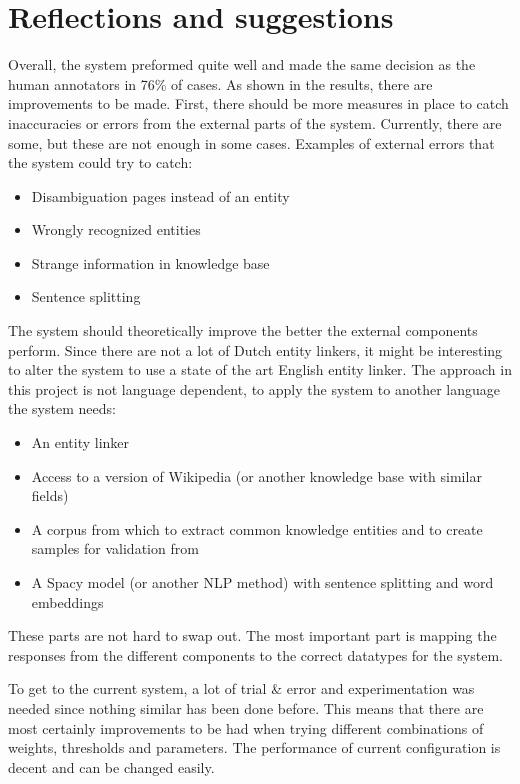 \documentclass[
10pt, %
a4paper, %
oneside, %
headinclude,footinclude, %
] {book}%
\begin{document}
\section{Reflections and suggestions}
Overall, the system preformed quite well and made the same decision as the human annotators in 76\% of cases.
As shown in the results, there are improvements to be made.
First, there should be more measures in place to catch inaccuracies or errors from the external parts of the system.
Currently, there are some, but these are not enough in some cases.
Examples of external errors that the system could try to catch:

\begin{multicols}{2}
  \begin{itemize}
    \item Disambiguation pages instead of an entity
    \item Wrongly recognized entities
    \item Strange information in knowledge base 
    \item Sentence splitting
  \end{itemize}
\end{multicols}

The system should theoretically improve the better the external components perform.
Since there are not a lot of Dutch entity linkers, it might be interesting to alter the system to use a state of the art English entity linker.
The approach in this project is not language dependent, to apply the system to another language the system needs:

\begin{multicols}{2}
  \begin{itemize}
    \item An entity linker
    \item Access to a version of Wikipedia (or another knowledge base with similar fields)
    \item A corpus from which to extract common knowledge entities and to create samples for validation from
    \item A Spacy model (or another NLP method) with sentence splitting and word embeddings
  \end{itemize}
\end{multicols}

These parts are not hard to swap out.
The most important part is mapping the responses from the different components to the correct datatypes for the system.

To get to the current system, a lot of trial \& error and experimentation was needed since nothing similar has been done before.
This means that there are most certainly improvements to be had when trying different combinations of weights, thresholds and parameters.
The performance of current configuration is decent and can be changed easily.
\end{document}
